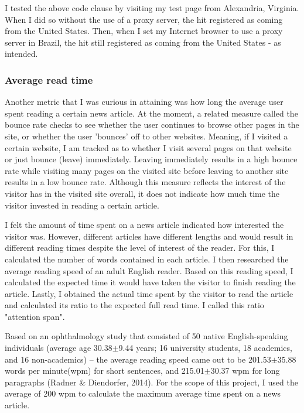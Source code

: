 \documentclass[12pt]{article}
\begin{document}
I tested the above code clause by visiting my test page from Alexandria, Virginia. When I did so without the use of a proxy server, the hit registered as coming from the United States. Then, when I set my Internet browser to use a proxy server in Brazil, the hit still registered as coming from the United States - as intended.

\subsubsection{Average read time}

Another metric that I was curious in attaining was how long the average user spent reading a certain news article. At the moment, a related measure called the bounce rate checks to see whether the user continues to browse other pages in the site, or whether the user 'bounces' off to other websites. Meaning, if I visited a certain website, I am tracked as to whether I visit several pages on that website or just bounce (leave) immediately. Leaving immediately results in a high bounce rate while visiting many pages on the visited site before leaving to another site results in a low bounce rate. 
Although this measure reflects the interest of the visitor has in the visited site overall, it does not indicate how much time the visitor invested in reading a certain article. 

I felt the amount of time spent on a news article indicated how interested the visitor was. However, different articles have different lengths and would result in different reading times despite the level of interest of the reader. For this, I calculated the number of words contained in each article. I then researched the average reading speed of an adult English reader. Based on this reading speed, I calculated the expected time it would have taken the visitor to finish reading the article. Lastly, I obtained the actual time spent by the visitor to read the article and calculated its ratio to the expected full read time. I called this ratio  "attention span". 

Based on an ophthalmology study that consisted of 50 native English-speaking individuals (average age 30.38$\pm$9.44 years; 16 university students, 18 academics, and 16 non-academics) -- the average reading speed came out to be 201.53$\pm$35.88 words per minute(wpm) for short sentences, and 215.01$\pm$30.37 wpm for long paragraphs (Radner \& Diendorfer, 2014). For the scope of this project, I used the average of 200 wpm to calculate the maximum average time spent on a news article.  
\end{document}
